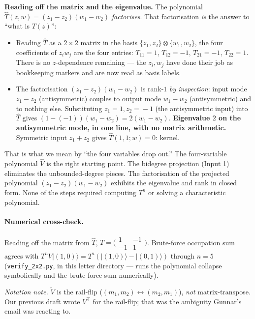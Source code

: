 \documentclass[11pt,a4paper]{article}
\begin{document}
\textbf{Reading off the matrix and the eigenvalue.} The polynomial $\widehat T(z,w) = (z_1-z_2)(w_1-w_2)$ \emph{factorises}. That factorisation \emph{is} the answer to ``what is $T(z)$'':
\begin{itemize}[leftmargin=2em,itemsep=1pt]
  \item Reading $\widehat T$ as a $2{\times}2$ matrix in the basis $\{z_1,z_2\}\!\otimes\!\{w_1,w_2\}$, the four coefficients of $z_iw_j$ are the four entries: $T_{11}{=}1$, $T_{12}{=}{-}1$, $T_{21}{=}{-}1$, $T_{22}{=}1$. There is no $z$-dependence remaining --- the $z_i,w_j$ have done their job as bookkeeping markers and are now read as basis labels.
  \item The factorisation $(z_1-z_2)(w_1-w_2)$ is rank-$1$ \emph{by inspection}: input mode $z_1-z_2$ (antisymmetric) couples to output mode $w_1-w_2$ (antisymmetric) and to nothing else. Substituting $z_1\!=\!1,z_2\!=\!{-}1$ (the antisymmetric input) into $\widehat T$ gives $(1-({-}1))(w_1-w_2) = 2(w_1-w_2)$. \textbf{Eigenvalue $2$ on the antisymmetric mode, in one line, with no matrix arithmetic.} Symmetric input $z_1+z_2$ gives $\widehat T(1,1;w) = 0$: kernel.
\end{itemize}
That is what we mean by ``the four variables drop out.'' The four-variable polynomial $\widehat V$ is the right starting point. The bidegree projection (Input 1) eliminates the unbounded-degree pieces. The factorisation of the projected polynomial $(z_1-z_2)(w_1-w_2)$ exhibits the eigenvalue and rank in closed form. None of the steps required computing $T^n$ or solving a characteristic polynomial.

\paragraph{Numerical cross-check.}
Reading off the matrix from $\widehat T$, $T = \bigl(\begin{smallmatrix}1 & -1 \\ -1 & 1\end{smallmatrix}\bigr)$. Brute-force occupation sum agrees with $T^n V |(1,0)\rangle = 2^n(|(1,0)\rangle - |(0,1)\rangle)$ through $n=5$ (\texttt{verify\_2x2.py}, in this letter directory --- runs the polynomial collapse symbolically and the brute-force sum numerically).

\emph{Notation note.} $\widetilde V$ is the rail-flip ($(m_1,m_2)\leftrightarrow(m_2,m_1)$), \emph{not} matrix-transpose. Our previous draft wrote $V^\top$ for the rail-flip; that was the ambiguity Gunnar's email was reacting to.
\end{document}
